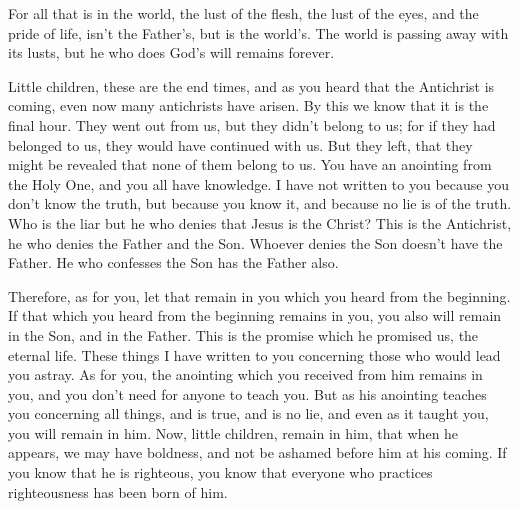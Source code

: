 {For all that is in the world, the lust of the flesh, the lust of the eyes, and the pride of life, isn’t the Father’s, but is the world’s.
The world is passing away with its lusts, but he who does God’s will remains forever.
\par }{\PP {}Little children, these are the end times, and as you heard that the Antichrist is coming, even now many antichrists have arisen. By this we know that it is the final hour.
They went out from us, but they didn’t belong to us; for if they had belonged to us, they would have continued with us. But they left, that they might be revealed that none of them belong to us.
You have an anointing from the Holy One, and you all have knowledge.
I have not written to you because you don’t know the truth, but because you know it, and because no lie is of the truth.
Who is the liar but he who denies that Jesus is the Christ? This is the Antichrist, he who denies the Father and the Son.
Whoever denies the Son doesn’t have the Father. He who confesses the Son has the Father also.
\par }{\PP {}Therefore, as for you, let that remain in you which you heard from the beginning. If that which you heard from the beginning remains in you, you also will remain in the Son, and in the Father.
This is the promise which he promised us, the eternal life.
These things I have written to you concerning those who would lead you astray.
As for you, the anointing which you received from him remains in you, and you don’t need for anyone to teach you. But as his anointing teaches you concerning all things, and is true, and is no lie, and even as it taught you, you will remain in him.
Now, little children, remain in him, that when he appears, we may have boldness, and not be ashamed before him at his coming.
If you know that he is righteous, you know that everyone who practices righteousness has been born of him.

}
